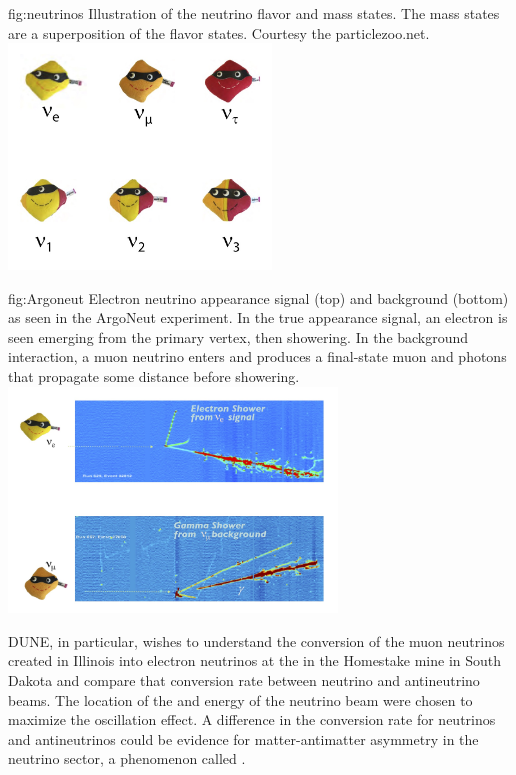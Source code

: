 \documentclass[../main-v1.tex]{subfiles}
\begin{document}
\begin{dunefigure}
{fig:neutrinos}
{Illustration of the neutrino flavor and mass states.  The mass states are a superposition of the flavor states.  Courtesy the particlezoo.net.}
\includegraphics[height=6cm]{graphics/IntroFigures/Fig_01_neutrinos.jpg}
\end{dunefigure}



\begin{dunefigure}
{fig:Argoneut}
{Electron neutrino appearance signal (top) and background (bottom) as seen in the ArgoNeut experiment.  In the true appearance signal, an electron is seen emerging from the primary vertex, then showering.  In the background interaction, a muon neutrino enters and  produces a final-state muon and photons that propagate some distance before showering.}
\includegraphics[trim={0cm 0.6cm 2.5cm 0.7cm},clip,height=6cm]{graphics/IntroFigures/Fig_02_Argoneut.jpg} 
\end{dunefigure}


DUNE,  in particular,   wishes to understand the conversion of the muon neutrinos created in Illinois%
into electron neutrinos at the  in the Homestake mine in South Dakota  %
and compare that conversion rate between neutrino and antineutrino beams. The location of the  and energy of the neutrino beam were chosen to maximize the oscillation effect.   A difference in the conversion rate for neutrinos and antineutrinos could be evidence for matter-antimatter asymmetry in the neutrino sector, a phenomenon called .  
\end{document}
